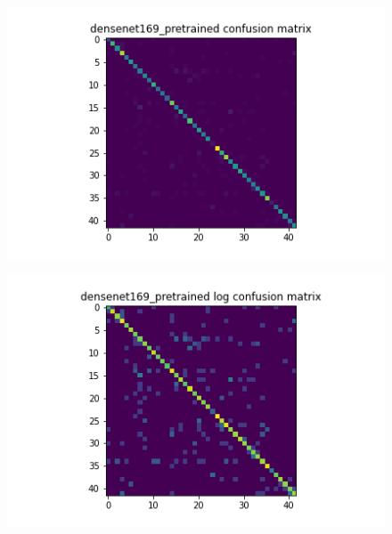 \begin{figure}[H]
  \begin{minipage}[b]{.5\linewidth}
    \centering
    {\includegraphics[width=1.2\textwidth]{figs/conf_matrix/densenet169_pretrained_conf.png}}
  \end{minipage}
  \hfill
  \begin{minipage}[b]{.5\linewidth}
    \centering

    {\includegraphics[width=1.2\textwidth]{figs/conf_matrix/densenet169_pretrained_log_conf.png}}
  \end{minipage}
  \vfill
  \begin{minipage}[b]{.5\linewidth}
    \centering


\end{minipage}
\end{figure}
